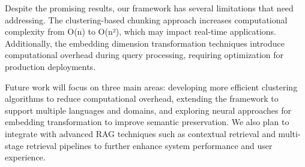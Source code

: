 \documentclass[10pt,twocolumn,letterpaper]{article}
\begin{document}
\vspace{0.5em}
Despite the promising results, our framework has several limitations that need addressing. The clustering-based chunking approach increases computational complexity from O(n) to O(n²), which may impact real-time applications. Additionally, the embedding dimension transformation techniques introduce computational overhead during query processing, requiring optimization for production deployments.

\vspace{0.5em}
Future work will focus on three main areas: developing more efficient clustering algorithms to reduce computational overhead, extending the framework to support multiple languages and domains, and exploring neural approaches for embedding transformation to improve semantic preservation. We also plan to integrate with advanced RAG techniques such as contextual retrieval and multi-stage retrieval pipelines to further enhance system performance and user experience.

{\small


}
\end{document}
